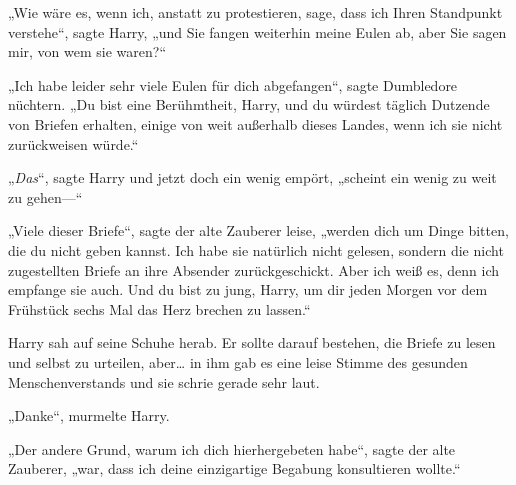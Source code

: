 „Wie wäre es, wenn ich, anstatt zu protestieren, sage, dass ich Ihren Standpunkt verstehe“, sagte Harry, „und Sie fangen weiterhin meine Eulen ab, aber Sie sagen mir, von wem sie waren?“

„Ich habe leider sehr viele Eulen für dich abgefangen“, sagte Dumbledore nüchtern. „Du bist eine Berühmtheit, Harry, und du würdest täglich Dutzende von Briefen erhalten, einige von weit außerhalb dieses Landes, wenn ich sie nicht zurückweisen würde.“

„\emph{Das}“, sagte Harry und jetzt doch ein wenig empört, „scheint ein wenig zu weit zu gehen—“

„Viele dieser Briefe“, sagte der alte Zauberer leise, „werden dich um Dinge bitten, die du nicht geben kannst. Ich habe sie natürlich nicht gelesen, sondern die nicht zugestellten Briefe an ihre Absender zurückgeschickt. Aber ich weiß es, denn ich empfange sie auch. Und du bist zu jung, Harry, um dir jeden Morgen vor dem Frühstück sechs Mal das Herz brechen zu lassen.“

Harry sah auf seine Schuhe herab. Er sollte darauf bestehen, die Briefe zu lesen und selbst zu urteilen, aber… in ihm gab es eine leise Stimme des gesunden Menschenverstands und sie schrie gerade sehr laut.

„Danke“, murmelte Harry.

„Der andere Grund, warum ich dich hierhergebeten habe“, sagte der alte Zauberer, „war, dass ich deine einzigartige Begabung konsultieren wollte.“

